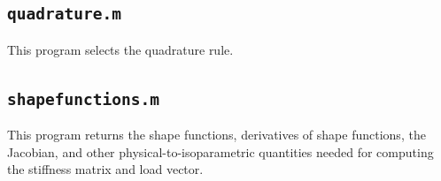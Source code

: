 \documentclass[10pt]{article}
\begin{document}
\subsection{\texttt{quadrature.m}}
This program selects the quadrature rule.


\subsection{\texttt{shapefunctions.m}}
This program returns the shape functions, derivatives of shape functions, the Jacobian, and other physical-to-isoparametric quantities needed for computing the stiffness matrix and load vector.

\end{document}
